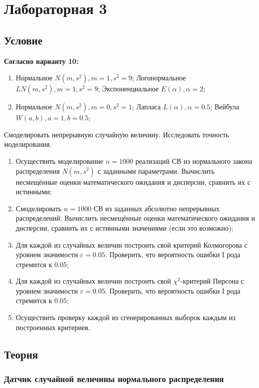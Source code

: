 \section{Лабораторная 3}

\subsection{Условие}

\textbf{Согласно варианту 10:}
\begin{enumerate}
	\item Нормальное $N(m, s^{2}), m = 1, s^{2} = 9$; Логонормальное $LN(m, s^{2}), m = 1, s^{2} = 9$; Экспоненциальное $E(\alpha), \alpha = 2$;
	\item Нормальное $N(m, s^{2}), m = 0, s^{2} = 1$; Лапласа $L(\alpha), \alpha = 0.5$; Вейбула $W(a, b), a = 1, b = 0.5$;
\end{enumerate}

Смоделировать непрерывную случайную величину. Исследовать точность моделирования.

\begin{enumerate}
	\item Осуществить моделирование $n = 1000$ реализаций СВ из нормального закона распределения $N(m, s^{2})$ с заданными параметрами. Вычислить несмещённые оценки математического ожидания и дисперсии, сравнить их с истинными;
	\item Смоделировать $n = 1000$ СВ из заданных абсолютно непрерывных распределений. Вычислить несмещённые оценки математического ожидания и дисперсии, сравнить их с истинными значениями (если это возможно);
	\item Для каждой из случайных величин построить свой критерий Колмогорова с уровнем значимости $\varepsilon = 0.05$. Проверить, что вероятность ошибки I рода стремится к 0.05;
	\item Для каждой из случайных величин построить свой $\chi^{2}$-критерий Пирсона с уровнем значимости $\varepsilon = 0.05$. Проверить, что вероятность ошибки I рода стремится к $0.05$;
	\item Осуществить проверку каждой из сгенерированных выборок каждым из построенных критериев.
\end{enumerate}

\subsection{Теория}
\subsubsection{Датчик случайной величины нормального распределения}


